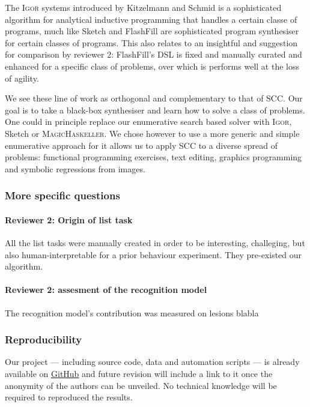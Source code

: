\documentclass{article}
\begin{document}
The \textsc{Igor} systems introduced by Kitzelmann and Schmid is a sophisticated
algorithm for analytical inductive programming that handles a certain classe of
programs, much like {Sketch} and {FlashFill} are sophisticated program
synthesiser for certain classes of programs. This also relates to an insightful
and suggestion for comparison by reviewer 2: FlashFill's DSL is fixed and
manually curated and enhanced for a specific class of problems, over which is
performs well at the loss of agility.

We see these line of work as orthogonal and complementary to that of SCC\@. Our
goal is to take a black-box synthesiser and learn how to solve a class of
problems. One could in principle replace our enumerative search based solver
with \textsc{Igor}, Sketch or \textsc{MagicHaskeller}. We chose however to
use a more generic and simple enumerative approach for it allows us to apply SCC
to a diverse spread of problems: functional programming exercises, text editing,
graphics programming and symbolic regressions from images.

\subsubsection*{More specific questions}

\paragraph*{Reviewer 2: Origin of list task} All the list tasks were manually
created in order to be interesting, challeging, but also human-interpretable for
a prior behaviour experiment. They pre-existed our algorithm.

\paragraph*{Reviewer 2: assesment of the recognition model} The recognition
model's contribution was measured on lesions blabla


\subsubsection*{Reproducibility}

Our project --- including source code, data and automation scripts --- is
already available on \url{GitHub} and future revision will include a link to it
once the anonymity of the authors can be unveiled. No technical knowledge will
be required to reproduced the results.
\end{document}
